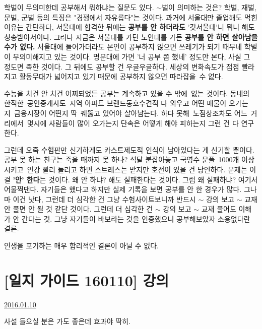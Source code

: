 학벌이 무의미한데 공부해서 뭐하냐는 질문도 있다.
$\sim$벌이 의미하는 것은? 학벌, 재벌, 문벌, 군벌 등의 특징은 "경쟁에서 자유롭다"는 것이다.
과거에 서울대만 졸업해도 먹힌 이유는 간단하다, 서울대에 합격한 뒤에는 \textbf{공부를 안 하더라도} '갓서울대'니 뭐니 해도 칭송받아서이다.
그러나 지금은 서울대를 가던 노인대를 가든 \textbf{공부를 안 하면 살아남을 수가 없다.}
서울대에 들어가더라도 본인이 공부하지 않으면 쓰레기가 되기 때무네 학벌이 무의미해지고 있는 것이다.
명문대에 가면 '너 공부 쫌 했네' 정도만 본다, 사실 그 정도면 족한 것이다. 그 뒤에도 공부할 건 우글우글하다.
세상의 변화속도가 점점 빨라지고 활동무대가 넓어지고 있기 때문에 공부하지 않으면 따라잡을 수 없다.
\vspace{5mm}

수능을 치건 안 치건 어찌되었든 공부는 계속하고 있을 수 밖에 없는 것이다.
동네의 한적한 공인중개사도 지역 아파트 브랜드동호수견적 다 외우고 어떤 매물이 오가는지 금융시장이 어떤지 딱 꿰뚫고 있어야 살아남는다.
하다 못해 노점상조차도 어느 거리에서 몇시에 사람들이 많이 오가는지 단속은 어떻게 해야 피하는지 그런 건 다 연구한다.
\vspace{5mm}

그런데 오죽 수험판만 신기하게도 카스트제도적 인식이 남아있다는 게 신기할 뿐이다.
공부 못 하는 친구는 죽을 때까지 못 하나?
석달 붙잡아놓고 국영수 문풀 1000개 이상 시키고 인강 빨리 돌리고 하면 스트레스는 받지만 호전이 있을 건 당연하다.
문제는 이걸 \textbf{'안' 한다}는 것이다.
왜 안 하냐? 해도 실패한다는 것이다. 그럼 왜 실패하냐? 여기서 어물쩍댄다.
자기들은 했다고 하지만 실제 기록을 보면 공부를 안 한 경우가 많다.
그나마 이건 낫다, 그런데 더 심각한 건 그냥 수험사이트보니까 반드시 $\sim$ 강의 보고 $\sim$ 교재 안 풀면 안 될 것 같단 것이다.
그런데 더 심각한 건 $\sim$ 강의 보고 $\sim$ 교재 풀어도 이해가 안 간다는 것. 그냥 자기들이 바보라는 것을 인증했으니 공부해보았자 소용없다란 결론.
\vspace{5mm}

인생을 포기하는 매우 합리적인 결론이 아닐 수 없다.
\vspace{5mm}






\section{[일지 가이드 160110] 강의}
\href{https://www.kockoc.com/Apoc/582726}{2016.01.10}

\vspace{5mm}

사설 들으실 분은 가도 좋은데 효과야 딱히.
\vspace{5mm}

